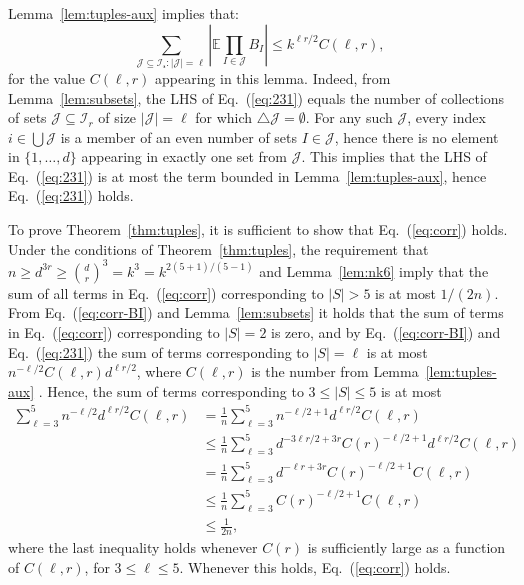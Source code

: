 \documentclass[final, 12pt]{colt2018}
\renewcommand{\eqref}[1]{Eq.~(\ref{#1})}
\begin{document}
Lemma~\ref{lem:tuples-aux} implies that:
\begin{equation} \label{eq:231}
\sum_{\mathcal{J} \subseteq \mathcal{\mathcal{I}_r} \colon \lvert \mathcal{J} \rvert = \ell} \left\lvert \mathbb{E} \prod_{I \in \mathcal{J}} B_I \right\rvert
\le k^{\ell r/2} C(\ell, r),
\end{equation}
for the value $C(\ell,r)$ appearing in this lemma. Indeed, from Lemma~\ref{lem:subsets}, the LHS of \eqref{eq:231} equals the number of collections of sets $\mathcal{J} \subseteq \mathcal{I}_r$ of size $\lvert \mathcal{J} \rvert = \ell$ for which $\bigtriangleup \mathcal{J} = \emptyset$. For any such $\mathcal{J}$, every index $i \in \bigcup \mathcal{J}$ is a member of an even number of sets $I \in \mathcal{J}$, hence there is no element in $\{ 1,\dots, d\}$ appearing in exactly one set from $\mathcal{J}$. This implies that the LHS of \eqref{eq:231} is at most the term bounded in Lemma~\ref{lem:tuples-aux}, hence \eqref{eq:231} holds.

To prove Theorem~\ref{thm:tuples}, it is sufficient to show that \eqref{eq:corr} holds. Under the conditions of Theorem~\ref{thm:tuples}, the requirement that $n \ge d^{3r} \ge \binom{d}{r}^3 = k^3 = k^{2(5 + 1)/(5-1)}$ and Lemma~\ref{lem:nk6} imply that the sum of all terms in \eqref{eq:corr} corresponding to $\lvert S \rvert > 5$ is at most $1/(2n)$. From \eqref{eq:corr-BI} and Lemma~\ref{lem:subsets} it holds that the sum of terms in \eqref{eq:corr} corresponding to $\lvert S \rvert = 2$ is zero, and by \eqref{eq:corr-BI} and \eqref{eq:231} the sum of terms corresponding to $\lvert S \rvert = \ell$ is at most $n^{-\ell/2} C(\ell,r) d^{\ell r/2}$, where $C(\ell, r)$ is the number from Lemma~\ref{lem:tuples-aux} . Hence, the sum of terms corresponding to $3 \le \lvert S \rvert \le 5$ is at most
\begin{align*}
\sum_{\ell=3}^5 n^{-\ell/2} d^{\ell r/2} C(\ell,r)
&= \frac{1}{n} \sum_{\ell=3}^5 n^{-\ell/2+1} d^{\ell r/2} C(\ell,r) \\
&\le \frac{1}{n} \sum_{\ell=3}^5 d^{-3\ell r/2+3r} C(r)^{-\ell/2+1} d^{\ell r/2} C(\ell,r) \\
&= \frac{1}{n} \sum_{\ell=3}^5 d^{-\ell r+3r} C(r)^{-\ell/2+1} C(\ell,r) \\
&\le \frac{1}{n} \sum_{\ell=3}^5 C(r)^{-\ell/2+1} C(\ell,r) \\
&\le \frac{1}{2n},
\end{align*}
where the last inequality holds whenever $C(r)$ is sufficiently large as a function of $C(\ell,r)$, for $3 \le \ell \le 5$. Whenever this holds, \eqref{eq:corr} holds.
\end{document}
